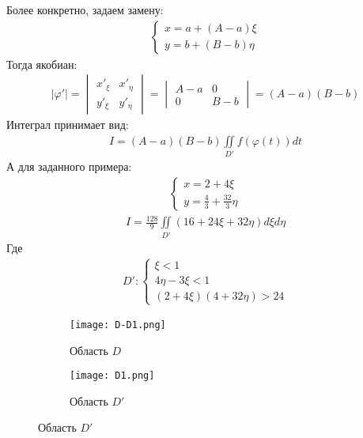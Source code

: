 Более конкретно, задаем замену:
\begin{align}
	\begin{cases}
		x = a + (A - a) \xi \\
		y = b + (B - b) \eta
	\end{cases}
\end{align}
Тогда якобиан:
\begin{align}
	|\varphi'| = \begin{vmatrix}
		             x'_\xi & x'_\eta \\
		             y'_\xi & y'_\eta
	             \end{vmatrix} = \begin{vmatrix}
		                             A - a & 0     \\
		                             0     & B - b
	                             \end{vmatrix} = (A - a) (B - b)
\end{align}
Интеграл принимает вид:
\begin{align}\label{eq:ab-iint}
	I = (A - a)(B - b)\iint\limits_{D'}f(\varphi(t))dt
\end{align}
А для заданного примера:
\begin{align}
	\begin{cases}
		x = 2 + 4 \xi \\
		y = \frac{4}{3} + \frac{32}{3} \eta
	\end{cases}
\end{align}
\begin{align}
	I = \frac{128}{9}\iint\limits_{D'}(16 + 24\xi + 32\eta)d\xi d\eta
\end{align}
Где
\begin{align}
	D'\colon \begin{cases}
		         \xi < 1      \\
		         4\eta-3\xi<1 \\
		         (2+4\xi)(4+32\eta)>24
	         \end{cases}
\end{align}

\begin{figure}[h]
	\begin{subfigure}{.5\textwidth}
		\centering
		\texttt{[image: D-D1.png]}
		\caption{Область \(D\)}
	\end{subfigure}
	\begin{subfigure}{.5\textwidth}
		\centering
		\texttt{[image: D1.png]}
		\caption{Область \(D'\)}
	\end{subfigure}
\end{figure}
